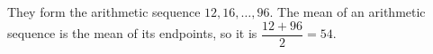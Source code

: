 They form the arithmetic sequence $12,16,\ldots,96$. The mean of an arithmetic sequence is the mean of its endpoints, so it is $\dfrac{12+96}{2}=\boxed{54}$.
